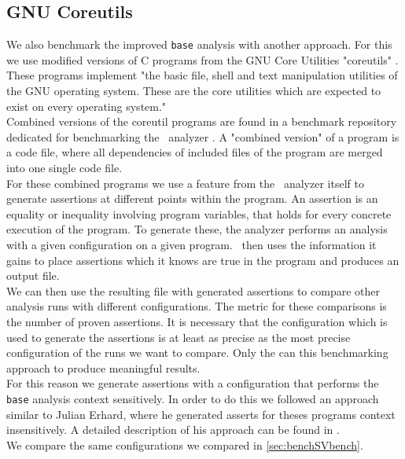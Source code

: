     \subsection{GNU Coreutils}\label{sec:benchCoreutils}
      We also benchmark the improved \texttt{base} analysis with another approach. For this we use modified versions of C programs from the GNU Core Utilities "coreutils" \parencite{gnuCoreutils}. These programs implement "the basic file, shell and text manipulation utilities of the GNU operating system. These are the core utilities which are expected to exist on every operating system."\parencite{gnuCoreutils}\\
      Combined versions of the coreutil programs are found in a benchmark repository dedicated for benchmarking the \gob\ analyzer \parencite{goblintBench}. A "combined version" of a program is a code file, where all dependencies of included files of the program are merged into one single code file.\\
      For these combined programs we use a feature from the \gob\ analyzer itself to generate assertions at different points within the program. An assertion is an equality or inequality involving program variables, that holds for every concrete execution of the program. To generate these, the analyzer performs an analysis with a given configuration on a given program. \gob\ then uses the information it gains to place assertions which it knows are true in the program and produces an output file.\\
      We can then use the resulting file with generated assertions to compare other analysis runs with different configurations. The metric for these comparisons is the number of proven assertions. It is necessary that the configuration which is used to generate the assertions is at least as precise as the most precise configuration of the runs we want to compare. Only the can this benchmarking approach to produce meaningful results.\\
      For this reason we generate assertions with a configuration that performs the \texttt{base} analysis context sensitively. In order to do this we followed an approach similar to Julian Erhard, where he generated asserts for theses programs context insensitively. A detailed description of his approach can be found in \parencite{svBenchCoreutils}.\\
      We compare the same configurations we compared in \autoref{sec:benchSVbench}.\\
      
